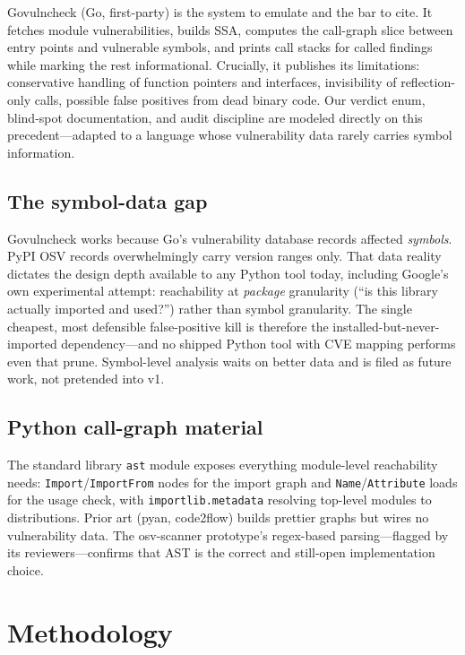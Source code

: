 \documentclass[11pt,a4paper]{article}
\begin{document}
Govulncheck (Go, first-party) is the system to emulate and the bar to cite. It fetches module vulnerabilities, builds SSA, computes the call-graph slice between entry points and vulnerable symbols, and prints call stacks for called findings while marking the rest informational. Crucially, it publishes its limitations: conservative handling of function pointers and interfaces, invisibility of reflection-only calls, possible false positives from dead binary code. Our verdict enum, blind-spot documentation, and audit discipline are modeled directly on this precedent---adapted to a language whose vulnerability data rarely carries symbol information.

\subsection{The symbol-data gap}

Govulncheck works because Go's vulnerability database records affected \textit{symbols}. PyPI OSV records overwhelmingly carry version ranges only. That data reality dictates the design depth available to any Python tool today, including Google's own experimental attempt: reachability at \textit{package} granularity (``is this library actually imported and used?'') rather than symbol granularity. The single cheapest, most defensible false-positive kill is therefore the installed-but-never-imported dependency---and no shipped Python tool with CVE mapping performs even that prune. Symbol-level analysis waits on better data and is filed as future work, not pretended into v1.

\subsection{Python call-graph material}

The standard library \verb!ast! module exposes everything module-level reachability needs: \verb!Import!/\verb!ImportFrom! nodes for the import graph and \verb!Name!/\verb!Attribute! loads for the usage check, with \verb!importlib.metadata! resolving top-level modules to distributions. Prior art (pyan, code2flow) builds prettier graphs but wires no vulnerability data. The osv-scanner prototype's regex-based parsing---flagged by its reviewers---confirms that AST is the correct and still-open implementation choice.

\section{Methodology}
\end{document}
